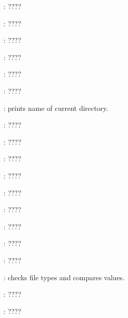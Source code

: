 \begin{compactenum}
\item [\symbolbash] : \dotfill ????

\item [\symbolbash] : \dotfill ????

\item [\symbolbash] : \dotfill ????

\item [\symbolbash] : \dotfill ????

\item [\symbolbash] : \dotfill ????

\item [\symbolbash] : \dotfill ????

\item [\symbolbash] : prints name of current directory.

\item [\symbolbash] : \dotfill ????

\item [\symbolbash] : \dotfill ????

\item [\symbolbash] : \dotfill ????

\item [\symbolbash] : \dotfill ????

\item [\symbolbash] : \dotfill ????

\item [\symbolbash] : \dotfill ????

\item [\symbolbash] : \dotfill ????

\item [\symbolbash] : \dotfill ????

\item [\symbolbash] : \dotfill ????

\item [\symbolbash] : checks file types and compares values.

\item [\symbolbash] : \dotfill ????

\item [\symbolbash] : \dotfill ????


\end{compactenum}
